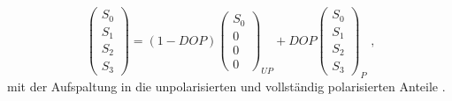 \begin{equation}
\left(
\begin{matrix}
S_0 \\ 
S_1 \\ 
S_2 \\ 
S_3
\end{matrix} 
\right)
= (1-DOP)
\left(
\begin{matrix}
S_0 \\ 
0 \\ 
0 \\ 
0
\end{matrix} 
\right)_{UP}
+ DOP
\left(
\begin{matrix}
S_0 \\ 
S_1 \\ 
S_2 \\ 
S_3
\end{matrix} 
\right)_{P} \text{ ,}
\end{equation}
mit der Aufspaltung in die unpolarisierten und vollständig polarisierten Anteile \cite{Schaefer.2007}. %
